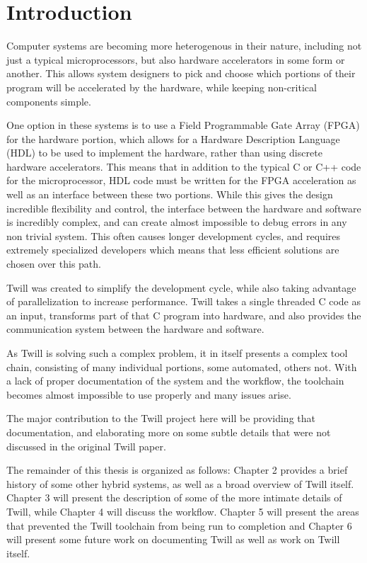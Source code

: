 \chapter{Introduction}
Computer systems are becoming more heterogenous in their nature, including not just a typical microprocessors, but also hardware accelerators in some form or another. This allows system designers to pick and choose which portions of their program will be accelerated by the hardware, while keeping non-critical components simple. 

One option in these systems is to use a Field Programmable Gate Array (FPGA) for the hardware portion, which allows for a Hardware Description Language (HDL) to be used to implement the hardware, rather than using discrete hardware accelerators. This means that in addition to the typical C or C++ code for the microprocessor, HDL code must be written for the FPGA acceleration as well as an interface between these two portions. While this gives the design incredible flexibility and control, the interface between the hardware and software is incredibly complex, and can create almost impossible to debug errors in any non trivial system. This often causes longer development cycles, and requires extremely specialized developers which means that less efficient solutions are chosen over this path.

Twill was created to simplify the development cycle, while also taking advantage of parallelization to increase performance. Twill takes a single threaded C code as an input, transforms part of that C program into hardware, and also provides the communication system between the hardware and software.

As Twill is solving such a complex problem, it in itself presents a complex tool chain, consisting of many individual portions, some automated, others not. With a lack of proper documentation of the system and the workflow, the toolchain becomes almost impossible to use properly and many issues arise.

The major contribution to the Twill project here will be providing that documentation, and elaborating more on some subtle details that were not discussed in the original Twill paper. 

The remainder of this thesis is organized as follows: Chapter 2 provides a brief history of some other hybrid systems, as well as a broad overview of Twill itself. Chapter 3 will present the description of some of the more intimate details of Twill, while Chapter 4 will discuss the workflow. Chapter 5 will present the areas that prevented the Twill toolchain from being run to completion and Chapter 6 will present some future work on documenting Twill as well as work on Twill itself.